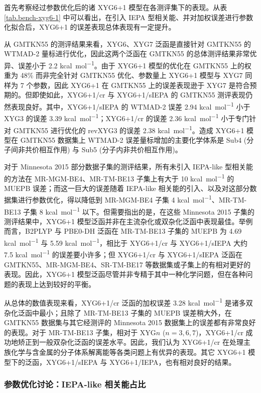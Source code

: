 首先考察经过参数优化后的诸 XYG6+1 模型在各测评集下的表现。从表 \ref{tab.bench-xyg6-1} 中可以看出，在引入 IEPA 型相关能、并对加权误差进行参数化拟合后，XYG6+1 的误差表现总体表现有一定提升。

从 GMTKN55 的测评结果来看，XYG6、XYG7 泛函是直接针对 GMTKN55 的 WTMAD-2 量标进行优化，因此这两个泛函在 GMTKN55 的总体测评结果非常优异、误差小于 2.2 \si{kcal.mol^{-1}}。由于 XYG6+1 模型的优化在 GMTKN55 上的权重为 48\% 而非完全针对 GMTKN55 优化、参数量上 XYG6+1 模型与 XYG7 同样为 7 个参数，因此 XYG6+1 在 GMTKN55 上的误差表现逊于 XYG7 是符合预期的。但即使如此，XYG6+1/cr 与 XYG6+1/sIEPA 的 GMTKN55 测评表现仍然表现良好。其中，XYG6+1/sIEPA 的 WTMAD-2 误差 2.94 \si{kcal.mol^{-1}} 小于 XYG3 的误差 3.39 \si{kcal.mol^{-1}}；XYG6+1/cr 的误差 2.36 \si{kcal.mol^{-1}} 小于专门针对 GMTKN55 进行优化的 revXYG3 的误差 2.38 \si{kcal.mol^{-1}}。造成 XYG6+1 模型在 GMTKN55 数据集上 WTMAD-2 误差量标增加的主要化学体系是 Sub4 (分子间非共价相互作用) 与 Sub5 (分子内非共价相互作用)。

对于 Minnesota 2015 部分数据子集的测评结果，所有未引入 IEPA-like 型相关能的方法在 MR-MGM-BE4、MR-TM-BE13 子集上有大于 10 \si{kcal.mol^{-1}} 的 MUEPB 误差；而这一巨大的误差随着 IEPA-like 相关能的引入、以及对这部分数据集进行参数优化，得以降低到 MR-MGM-BE4 子集 4 \si{kcal.mol^{-1}}、MR-TM-BE13 子集 8 \si{kcal.mol^{-1}} 以下。但需要指出的是，在这些 Minnesota 2015 子集的测评结果中，XYG6+1 模型泛函并非在主流杂化或双杂化泛函中表现最佳。举例而言，B2PLYP 与 PBE0-DH 泛函在 MR-TM-BE13 子集的 MUEPB 为 4.69 \si{kcal.mol^{-1}} 与 5.59 \si{kcal.mol^{-1}}，相比于 XYG6+1/cr 与 XYG6+1/sIEPA 大约 7.5 \si{kcal.mol^{-1}} 的误差要小许多；但 XYG6+1/cr 与 XYG6+1/sIEPA 泛函在 GMTKN55、MR-MGM-BE4、SR-TM-BE17 等数据集或子集上的有相对更好的表现。因此，XYG6+1 模型泛函尽管并非专精于其中一种化学问题，但在各种问题的表现上达到较好的平衡。

从总体的数值表现来看，XYG6+1/cr 泛函的加权误差 3.28 \si{kcal.mol^{-1}} 是诸多双杂化泛函中最小；且除了 MR-TM-BE13 子集的 MUEPB 误差稍大外，在 GMTKN55 数据集与其它经测评的 Minnesota 2015 数据集上的误差都有非常良好的表现。对于 MR-TM-BE13 子集，相对于 XYG$n$ ($n=3,6,7$)，XYG6+1/cr 成功地矫正到一般双杂化泛函的误差水平。因此，我们认为 XYG6+1/cr 在处理主族化学与含金属的分子体系解离能等各类问题上有优异的表现。其它 XYG6+1 模型下的泛函，XYG6+1/sIEPA 与 XYG6+1/IEPA，也有相对良好的结果。

\subsubsection{参数优化讨论：IEPA-like 相关能占比}
\label{sec.proportion-iepa-like}

